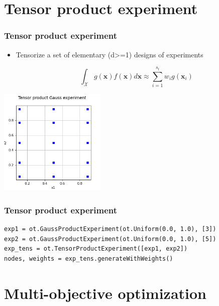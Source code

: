 \documentclass{beamer}
\begin{document}
\section{Tensor product experiment}

\begin{frame}[containsverbatim]
\frametitle{Tensor product experiment}

\begin{itemize}
\item Tensorize a set of elementary (d>=1) designs of experiments

$$
\int_{\mathcal{X}} g(\boldsymbol{x}) f(\boldsymbol{x}) d\boldsymbol{x} 
    \approx \sum_{i = 1}^{s_t} w_i g\left(\boldsymbol{x}_i\right)
$$

\end{itemize}


\begin{center}
\includegraphics[width=0.38\textwidth]{figures/TensorProductExperiment.png}
\end{center}
\end{frame}


\begin{frame}[containsverbatim]
\frametitle{Tensor product experiment}


\lstset{language=python}
\begin{lstlisting}
exp1 = ot.GaussProductExperiment(ot.Uniform(0.0, 1.0), [3])
exp2 = ot.GaussProductExperiment(ot.Uniform(0.0, 1.0), [5])
exp_tens = ot.TensorProductExperiment([exp1, exp2])
nodes, weights = exp_tens.generateWithWeights()
\end{lstlisting}

\end{frame}


\section{Multi-objective optimization}
\end{document}
